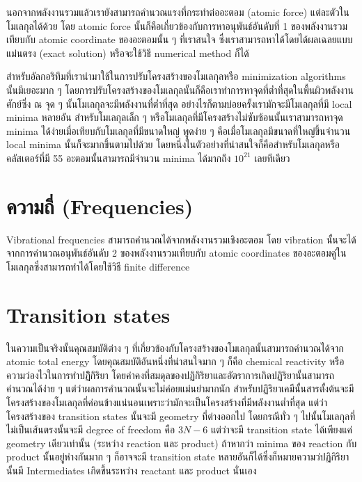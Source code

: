 นอกจากพลังงานรวมแล้วเรายังสามารถคำนวณแรงที่กระทำต่ออะตอม (atomic force) แต่ละตัวในโมเลกุลได้ด้วย 
โดย atomic force นั้นก็คือเกี่ยวข้องกับการหาอนุพันธ์อันดับที่ 1 ของพลังงานรวมเทียบกับ atomic coordinate 
ของอะตอมนั้น ๆ ที่เราสนใจ ซึ่งเราสามารถหาได้โดยได้ผลเฉลยแบบแม่นตรง (exact solution) หรือจะใช้วิธี 
numerical method ก็ได้

สำหรับอัลกอริทึมที่เรานำมาใช้ในการปรับโครงสร้างของโมเลกุลหรือ minimization algorithms นั้นมีเยอะมาก ๆ 
โดยการปรับโครงสร้างของโมเลกุลนั้นก็คือเราทำการหาจุดที่ต่ำที่สุดในพื้นผิวพลังงานศักย์ซึ่ง 
ณ จุด ๆ นั้นโมเลกุลจะมีพลังงานที่ต่ำที่สุด อย่างไรก็ตามบ่อยครั้งเรามักจะมีโมเลกุลที่มี local minima หลายอัน 
สำหรับโมเลกุลเล็ก ๆ หรือโมเลกุลที่มีโครงสร้างไม่ซับซ้อนนั้นเราสามารถหาจุด minima 
ได้ง่ายเมื่อเทียบกับโมเลกุลที่มีขนาดใหญ่ พูดง่าย ๆ คือเมื่อโมเลกุลมีขนาดที่ใหญ่ขึ้นจำนวน local minima 
นั้นก็จะมากขึ้นตามไปด้วย โดยหนึ่งในตัวอย่างที่น่าสนใจก็คือสำหรับโมเลกุลหรือคลัสเตอร์ที่มี 55 อะตอมนั้นสามารถมีจำนวน 
minima ได้มากถึง $10^{21}$ เลยทีเดียว

\section{ความถี่ (Frequencies)}

Vibrational frequencies สามารถคำนวณได้จากพลังงานรวมเชิงอะตอม โดย vibration 
นั้นจะได้จากการคำนวณอนุพันธ์อันดับ 2 ของพลังงานรวมเทียบกับ atomic coordinates 
ของอะตอมคู่ในโมเลกุลซึ่งสามารถทำได้โดยใช้วิธี finite difference 

\section{Transition states}

ในความเป็นจริงนั้นคุณสมบัติต่าง ๆ ที่เกี่ยวข้องกับโครงสร้างของโมเลกุลนั้นสามารถคำนวณได้จาก atomic total energy 
โดยคุณสมบัติอันหนึ่งที่น่าสนใจมาก ๆ ก็คือ chemical reactivity หรือความว่องไวในการทำปฏิิกิริยา 
โดยค่าคงที่สมดุลของปฏิกิริยาและอัตราการเกิดปฏิริยานั้นสามารถคำนวณได้ง่าย ๆ แต่ว่าผลการคำนวณนั้นจะไม่ค่อยแม่นยำมากนัก 
สำหรับปฏิริยาเคมีนั้นสารตั้งต้นจะมีโครงสร้างของโมเลกุลที่ค่อนข้างแน่นอนเพราะว่ามักจะเป็นโครงสร้างที่มีพลังงานต่ำที่สุด 
แต่ว่าโครงสร้างของ transition states นั้นจะมี geometry ที่ต่างออกไป โดยกรณีทั่ว ๆ ไปนั้นโมเลกุลที่ไม่เป็นเส้นตรงนั้นจะมี 
degree of freedom คือ $3N - 6$ แต่ว่าจะมี transition state ได้เพียงแค่ geometry เดียวเท่านั้น 
(ระหว่าง reaction และ product) ถ้าหากว่า minima ของ reaction กับ product นั้นอยู่ห่างกันมาก ๆ 
ก็อาจจะมี transition state หลายอันก็ได้ซึ่งก็หมายความว่ปฏิกิริยานั้นมี Intermediates เกิดขึ้นระหว่าง 
reactant และ product นั่นเอง 

